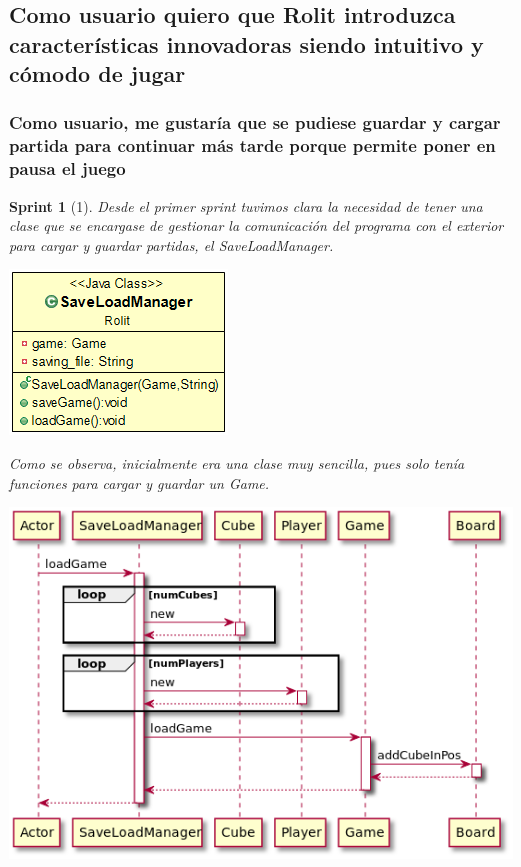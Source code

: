 \documentclass{article}
\theoremstyle{break}
\newtheorem*{sprint}{Sprint}
\begin{document}
\subsection{Como usuario quiero que Rolit introduzca características innovadoras siendo intuitivo y cómodo de jugar}
\subsubsection{Como usuario, me gustaría que se pudiese guardar y cargar partida para continuar más tarde porque permite poner en pausa el juego}
\begin{sprint}[1]
Desde el primer sprint tuvimos clara la necesidad de tener una clase que se encargase de gestionar la comunicación del programa con el exterior para cargar y guardar partidas, el \textit{SaveLoadManager}.

\begin{center}
\centering
\includegraphics[scale=0.5]{save-load-manager-sprint1.png}
\end{center}

Como se observa, inicialmente era una clase muy sencilla, pues solo tenía funciones para cargar y guardar un \textit{Game}.

\begin{center}
\centering
\includegraphics[scale=0.5]{load-sprint1.png}


\end{center}
\end{sprint}
\end{document}
